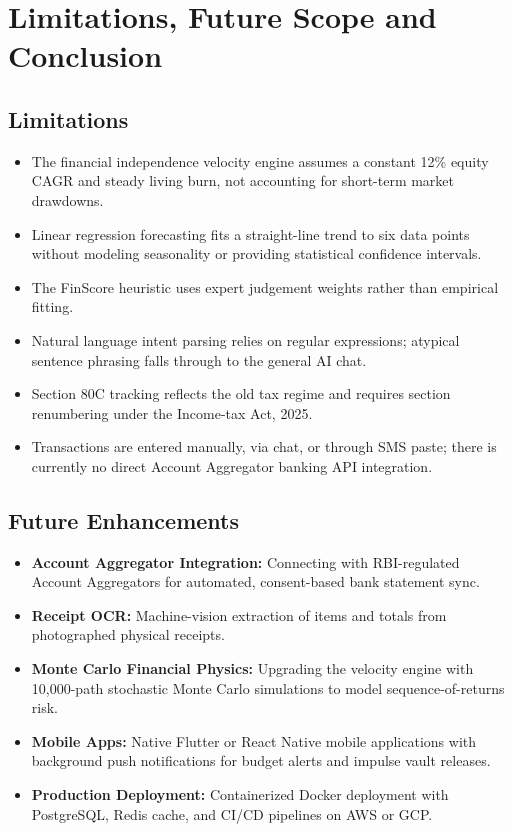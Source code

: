 \documentclass[12pt,a4paper]{report}
\begin{document}
\chapter{Limitations, Future Scope and Conclusion}\label{ch6}

\section{Limitations}\label{s60}

\begin{itemize}[leftmargin=*]
    \item The financial independence velocity engine assumes a constant 12\% equity CAGR and steady living burn, not accounting for short-term market drawdowns.
    \item Linear regression forecasting fits a straight-line trend to six data points without modeling seasonality or providing statistical confidence intervals.
    \item The FinScore heuristic uses expert judgement weights rather than empirical fitting.
    \item Natural language intent parsing relies on regular expressions; atypical sentence phrasing falls through to the general AI chat.
    \item Section 80C tracking reflects the old tax regime and requires section renumbering under the Income-tax Act, 2025.
    \item Transactions are entered manually, via chat, or through SMS paste; there is currently no direct Account Aggregator banking API integration.
\end{itemize}


\section{Future Enhancements}\label{s61}

\begin{itemize}[leftmargin=*]
    \item \textbf{Account Aggregator Integration:} Connecting with RBI-regulated Account Aggregators for automated, consent-based bank statement sync.
    \item \textbf{Receipt OCR:} Machine-vision extraction of items and totals from photographed physical receipts.
    \item \textbf{Monte Carlo Financial Physics:} Upgrading the velocity engine with 10,000-path stochastic Monte Carlo simulations to model sequence-of-returns risk.
    \item \textbf{Mobile Apps:} Native Flutter or React Native mobile applications with background push notifications for budget alerts and impulse vault releases.
    \item \textbf{Production Deployment:} Containerized Docker deployment with PostgreSQL, Redis cache, and CI/CD pipelines on AWS or GCP.
\end{itemize}
\end{document}
